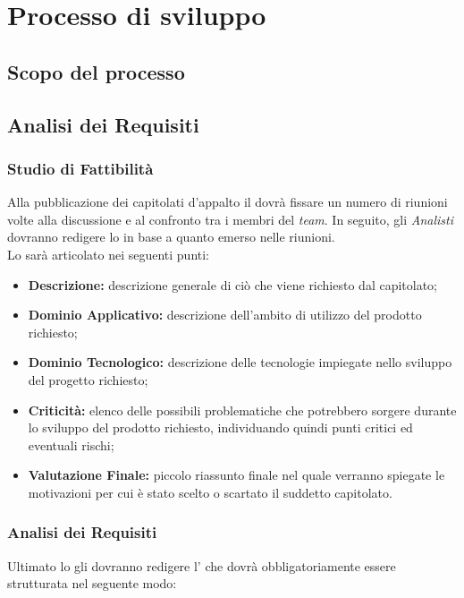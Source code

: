 \section{Processo di sviluppo}

\subsection{Scopo del processo}

\subsection{Analisi dei Requisiti}
\subsubsection{Studio di Fattibilità}
Alla pubblicazione dei capitolati d'appalto il \textit{\RdP} dovrà fissare un
numero di riunioni volte alla discussione e al confronto tra i membri del \textit{team}.
In seguito, gli \textit{Analisti} dovranno redigere lo \textit{\SdF} in base a quanto
emerso nelle riunioni.\\
Lo \textit{\SdF} sarà articolato nei seguenti punti:
\begin{itemize}
  \item \textbf{Descrizione:} descrizione generale di ciò che viene richiesto
  dal capitolato;
  \item \textbf{Dominio Applicativo:} descrizione dell'ambito di utilizzo del
  prodotto richiesto;
  \item \textbf{Dominio Tecnologico:} descrizione delle tecnologie impiegate
  nello sviluppo del progetto richiesto;
  \item \textbf{Criticità:} elenco delle possibili problematiche che potrebbero
  sorgere durante lo sviluppo del prodotto richiesto, individuando quindi punti
  critici ed eventuali rischi;
  \item \textbf{Valutazione Finale:} piccolo riassunto finale nel quale verranno
  spiegate le motivazioni per cui è stato scelto o scartato il suddetto
  capitolato.
\end{itemize}

\subsubsection{Analisi dei Requisiti}
Ultimato lo \textit{\SdF} gli \textit{\Anas} dovranno redigere l'\textit{\AdR}
che dovrà obbligatoriamente essere strutturata nel seguente modo:

